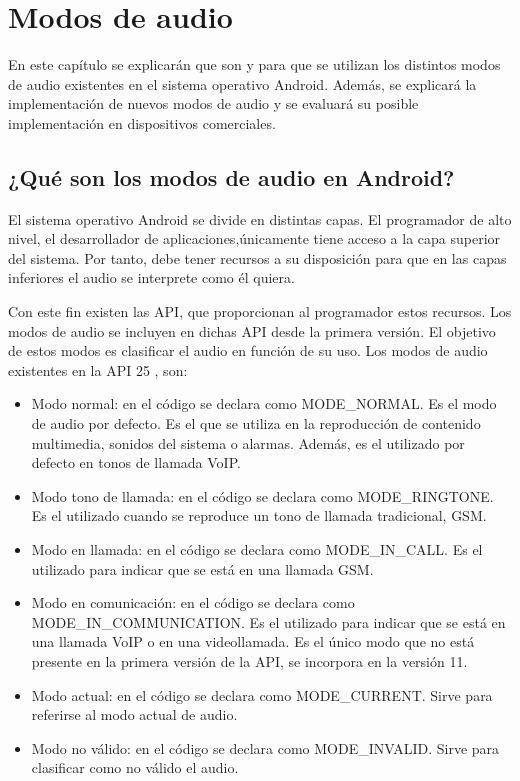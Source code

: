 \chapter{Modos de audio} \label{chap:modos}
En este capítulo se explicarán que son y para que se utilizan los distintos modos de audio existentes en el sistema operativo Android.
Además, se explicará la implementación de nuevos modos de audio y se evaluará su posible implementación en dispositivos comerciales.

\section{¿Qué son los modos de audio en Android?}
El sistema operativo Android se divide en distintas capas. El programador de alto nivel, el desarrollador de aplicaciones,únicamente tiene acceso a la capa superior del sistema. Por tanto, debe tener recursos a su disposición para que en las capas inferiores el audio se interprete como él quiera.

Con este fin existen las \gls{API}, que proporcionan al programador estos recursos. Los modos de audio se incluyen en dichas \gls{API} desde la primera versión. El objetivo de estos modos es clasificar el audio en función de su uso. Los modos de audio existentes en la \gls{API} 25 \cite{audio_manager}, son:

\begin{itemize}
	\item{Modo normal: en el código se declara como MODE\_NORMAL. Es el modo de audio por defecto. Es el que se utiliza en la reproducción de contenido multimedia, sonidos del sistema o alarmas. Además, es el utilizado por defecto en tonos de llamada \gls{VoIP}.}
	\item{Modo tono de llamada: en el código se declara como MODE\_RINGTONE. Es el utilizado cuando se reproduce un tono de llamada tradicional, \gls{GSM}.}
	\item{Modo en llamada: en el código se declara como MODE\_IN\_CALL. Es el utilizado para indicar que se está en una llamada \gls{GSM}.}
	\item{Modo en comunicación: en el código se declara como MODE\_IN\_COMMUNICATION. Es el utilizado para indicar que se está en una llamada \gls{VoIP} o en una videollamada. Es el único modo que no está presente en la primera versión de la \gls{API}, se incorpora en la versión 11.}
	\item{Modo actual: en el código se declara como MODE\_CURRENT. Sirve para referirse al modo actual de audio.}
	\item{Modo no válido: en el código se declara como MODE\_INVALID. Sirve para clasificar como no válido el audio.}
\end{itemize}

